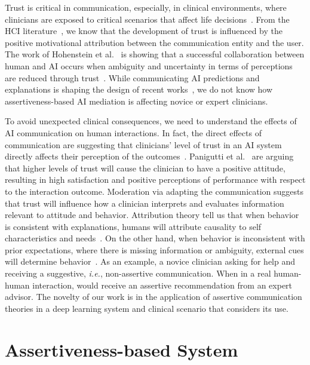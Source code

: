 Trust is critical in communication, especially, in clinical environments, where clinicians are exposed to critical scenarios that affect life decisions~\cite{Amann2020}.
From the HCI literature~\cite{10.1145/3479587, 10.1145/3334480.3375147, 10.1145/3334480.3382842}, we know that the development of trust is influenced by the positive motivational attribution between the communication entity and the user.
The work of Hohenstein et al.~\cite{HOHENSTEIN2020106190} is showing that a successful collaboration between human and AI occurs when ambiguity and uncertainty in terms of perceptions are reduced through trust~\cite{HOHENSTEIN2020106190}.
While communicating AI predictions and explanations is shaping the design of recent works~\cite{Lundberg2020, 10.1145/1518701.1518832}, we do not know how assertiveness-based AI mediation is affecting novice or expert clinicians.

To avoid unexpected clinical consequences, we need to understand the effects of AI communication on human interactions.
In fact, the direct effects of communication are suggesting that clinicians' level of trust in an AI system directly affects their perception of the outcomes~\cite{HOHENSTEIN2020106190}.
Panigutti et al.~\cite{10.1145/3491102.3502104} are arguing that higher levels of trust will cause the clinician to have a positive attitude, resulting in high satisfaction and positive perceptions of performance with respect to the interaction outcome.
Moderation via adapting the communication suggests that trust will influence how a clinician interprets and evaluates information relevant to attitude and behavior.
Attribution theory tell us that when behavior is consistent with explanations, humans will attribute causality to self characteristics and needs~\cite{LOMBROZO2010303}.
On the other hand, when behavior is inconsistent with prior expectations, where there is missing information or ambiguity, external cues will determine behavior~\cite{HOHENSTEIN2020106190}.
As an example, a novice clinician asking for help and receiving a suggestive, {\it i.e.}, non-assertive communication.
When in a real human-human interaction, would receive an assertive recommendation from an expert advisor.
The novelty of our work is in the application of assertive communication theories in a deep learning system and clinical scenario that considers its use.

\section{Assertiveness-based System}
\label{sec:chap006003}

